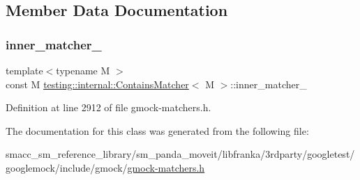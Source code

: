 \subsection{Member Data Documentation}
\mbox{\label{classtesting_1_1internal_1_1ContainsMatcher_ab6b76656910ef5018783dc258dcb1f08}} 
\subsubsection{\texorpdfstring{inner\+\_\+matcher\+\_\+}{inner\_matcher\_}}
{\footnotesize\ttfamily template$<$typename M $>$ \\
const M \hyperlink{classtesting_1_1internal_1_1ContainsMatcher}{testing\+::internal\+::\+Contains\+Matcher}$<$ M $>$\+::inner\+\_\+matcher\+\_\+\hspace{0.3cm}{\ttfamily [private]}}



Definition at line 2912 of file gmock-\/matchers.\+h.



The documentation for this class was generated from the following file\+:\begin{DoxyCompactItemize}
\item 
smacc\+\_\+sm\+\_\+reference\+\_\+library/sm\+\_\+panda\+\_\+moveit/libfranka/3rdparty/googletest/googlemock/include/gmock/\hyperlink{gmock-matchers_8h}{gmock-\/matchers.\+h}\end{DoxyCompactItemize}
